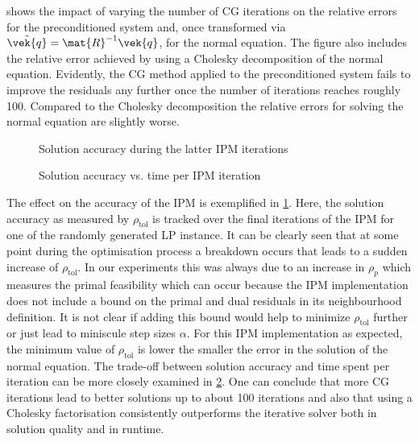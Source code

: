  shows the impact of varying the number of CG iterations on the relative errors for the preconditioned system and, once transformed via \(\tilde{\vek{q}} = \mat{R}^{-1}\vek{q}\), for the normal equation.
The figure also includes the relative error achieved by using a Cholesky decomposition of the normal equation.
Evidently, the CG method applied to the preconditioned system fails to improve the residuals any further once the number of iterations reaches roughly 100.
Compared to the Cholesky decomposition the relative errors for solving the normal equation are slightly worse.

\begin{figure}[tbp]
  \centering%
  \caption{Solution accuracy during the latter IPM iterations}%
  \label{fig:accuracy_history}
\end{figure}

\begin{figure}[tbp]
  \centering%
  \caption{Solution accuracy vs. time per IPM iteration}%
  \label{fig:accuracy_vs_time}
\end{figure}

The effect on the accuracy of the IPM is exemplified in \cref{fig:accuracy_history}.
Here, the solution accuracy as measured by \(\rho_{\mathrm{tol}}\) is tracked over the final iterations of the IPM for one of the randomly generated LP instance.
It can be clearly seen that at some point during the optimisation process a breakdown occurs that leads to a sudden increase of \(\rho_{\mathrm{tol}}\).
In our experiments this was always due to an increase in \(\rho_p\) which measures the primal feasibility which can occur because the IPM implementation does not include a bound on the primal and dual residuals in its neighbourhood definition. 
It is not clear if adding this bound would help to minimize \(\rho_{\mathrm{tol}}\) further or just lead to miniscule step sizes \(\alpha\).
For this IPM implementation as expected, the minimum value of \(\rho_{\mathrm{tol}}\) is lower the smaller the error in the solution of the normal equation.
The trade-off between solution accuracy and time spent per iteration can be more closely examined in \cref{fig:accuracy_vs_time}.
One can conclude that more CG iterations lead to better solutions up to about 100 iterations and also that using a Cholesky factorisation consistently outperforms the iterative solver both in solution quality and in runtime.

